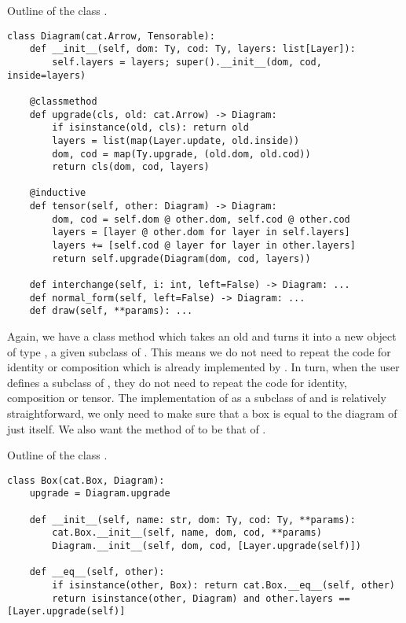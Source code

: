 \begin{python}
{\normalfont Outline of the class .}
\begin{verbatim}
class Diagram(cat.Arrow, Tensorable):
    def __init__(self, dom: Ty, cod: Ty, layers: list[Layer]):
        self.layers = layers; super().__init__(dom, cod, inside=layers)

    @classmethod
    def upgrade(cls, old: cat.Arrow) -> Diagram:
        if isinstance(old, cls): return old
        layers = list(map(Layer.update, old.inside))
        dom, cod = map(Ty.upgrade, (old.dom, old.cod))
        return cls(dom, cod, layers)

    @inductive
    def tensor(self, other: Diagram) -> Diagram:
        dom, cod = self.dom @ other.dom, self.cod @ other.cod
        layers = [layer @ other.dom for layer in self.layers]
        layers += [self.cod @ layer for layer in other.layers]
        return self.upgrade(Diagram(dom, cod, layers))

    def interchange(self, i: int, left=False) -> Diagram: ...
    def normal_form(self, left=False) -> Diagram: ...
    def draw(self, **params): ...
\end{verbatim}
\end{python}

Again, we have a class method  which takes an old  and turns it into a new object of type , a given subclass of .
This means we do not need to repeat the code for identity or composition which is already implemented by .
In turn, when the user defines a subclass of , they do not need to repeat the code for identity, composition or tensor.
The implementation of  as a subclass of  and  is relatively straightforward, we only need to make sure that a box is equal to the diagram of just itself.
We also want the  method of  to be that of .

\begin{python}
{\normalfont Outline of the class .}
\begin{verbatim}
class Box(cat.Box, Diagram):
    upgrade = Diagram.upgrade

    def __init__(self, name: str, dom: Ty, cod: Ty, **params):
        cat.Box.__init__(self, name, dom, cod, **params)
        Diagram.__init__(self, dom, cod, [Layer.upgrade(self)])

    def __eq__(self, other):
        if isinstance(other, Box): return cat.Box.__eq__(self, other)
        return isinstance(other, Diagram) and other.layers == [Layer.upgrade(self)]
\end{verbatim}
\end{python}

